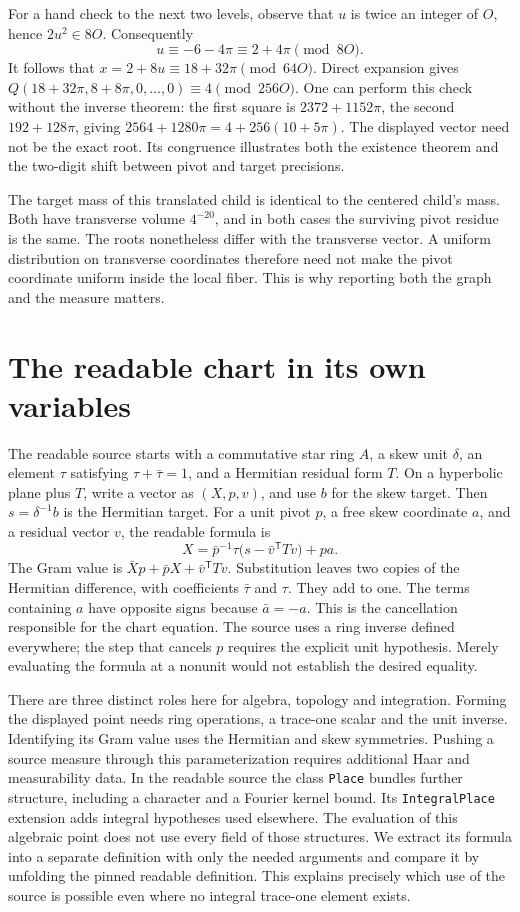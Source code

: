 \documentclass[12pt,letterpaper]{article}
\newcommand{\id}[1]{{\small\nolinkurl{#1}}}
\begin{document}
For a hand check to the next two levels, observe that $u$ is twice an integer of $O$, hence $2u^2\in8O$. Consequently
\[
       u\equiv -6-4\pi\equiv 2+4\pi\pmod{8O}.
\]
It follows that $x=2+8u\equiv18+32\pi\pmod{64O}$. Direct expansion gives $Q(18+32\pi,8+8\pi,0,\ldots,0)\equiv4\pmod{256O}$. One can perform this check without the inverse theorem: the first square is $2372+1152\pi$, the second $192+128\pi$, giving $2564+1280\pi=4+256(10+5\pi)$. The displayed vector need not be the exact root. Its congruence illustrates both the existence theorem and the two-digit shift between pivot and target precisions.

The target mass of this translated child is identical to the centered child's mass. Both have transverse volume $4^{-20}$, and in both cases the surviving pivot residue is the same. The roots nonetheless differ with the transverse vector. A uniform distribution on transverse coordinates therefore need not make the pivot coordinate uniform inside the local fiber. This is why reporting both the graph and the measure matters.
\section{The readable chart in its own variables}
The readable source starts with a commutative star ring $A$, a skew unit $\delta$, an element $\tau$ satisfying $\tau+\bar\tau=1$, and a Hermitian residual form $T$. On a hyperbolic plane plus $T$, write a vector as $(X,p,v)$, and use $b$ for the skew target. Then $s=\delta^{-1}b$ is the Hermitian target. For a unit pivot $p$, a free skew coordinate $a$, and a residual vector $v$, the readable formula is
\[
  X=\bar p^{-1}\tau\bigl(s-\bar v^{\mathsf T}Tv\bigr)+pa .
\]
The Gram value is $\bar Xp+\bar pX+\bar v^{\mathsf T}Tv$. Substitution leaves two copies of the Hermitian difference, with coefficients $\bar\tau$ and $\tau$. They add to one. The terms containing $a$ have opposite signs because $\bar a=-a$. This is the cancellation responsible for the chart equation. The source uses a ring inverse defined everywhere; the step that cancels $p$ requires the explicit unit hypothesis. Merely evaluating the formula at a nonunit would not establish the desired equality.

There are three distinct roles here for algebra, topology and integration. Forming the displayed point needs ring operations, a trace-one scalar and the unit inverse. Identifying its Gram value uses the Hermitian and skew symmetries. Pushing a source measure through this parameterization requires additional Haar and measurability data. In the readable source the class \id{Place} bundles further structure, including a character and a Fourier kernel bound. Its \id{IntegralPlace} extension adds integral hypotheses used elsewhere. The evaluation of this algebraic point does not use every field of those structures. We extract its formula into a separate definition with only the needed arguments and compare it by unfolding the pinned readable definition. This explains precisely which use of the source is possible even where no integral trace-one element exists.
\end{document}
